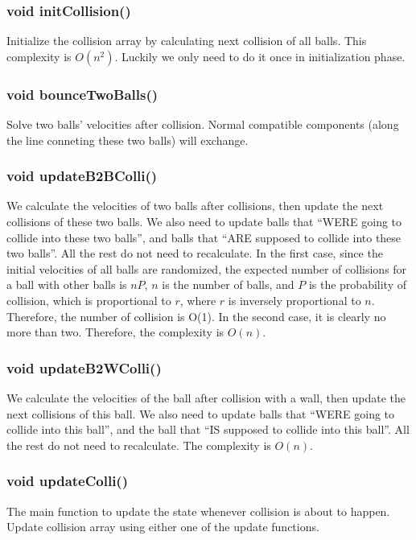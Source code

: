 \documentclass[twoside,10pt]{article}
\begin{document}
\subsubsection{void initCollision()}
Initialize the collision array by calculating next collision of all balls. This complexity is $O(n^2)$. Luckily we only need to do it once in initialization phase. 

\subsubsection{void bounceTwoBalls()}
Solve two balls' velocities after collision. Normal compatible components (along the line conneting these two balls) will exchange. 

\subsubsection{void updateB2BColli()}
We calculate the velocities of two balls after collisions, then update the next collisions of these two balls. We also need to update balls that ``WERE going to collide into these two balls'', and balls that ``ARE supposed to collide into these two balls''. All the rest do not need to recalculate. In the first case, since the initial velocities of all balls are randomized, the expected number of collisions for a ball with other balls is $nP$, $n$ is the number of balls, and $P$ is the probability of collision, which is proportional to $r$, where $r$ is inversely proportional to $n$. Therefore, the number of collision is O(1). In the second case, it is clearly no more than two. Therefore, the complexity is $O(n)$.

\subsubsection{void updateB2WColli()}
We calculate the velocities of the ball after collision with a wall, then update the next collisions of this ball. We also need to update balls that ``WERE going to collide into this ball'', and the ball that ``IS supposed to collide into this ball''. All the rest do not need to recalculate. The complexity is $O(n)$.

\subsubsection{void updateColli()}
The main function to update the state whenever collision is about to happen. Update collision array using either one of the update functions.
\end{document}
